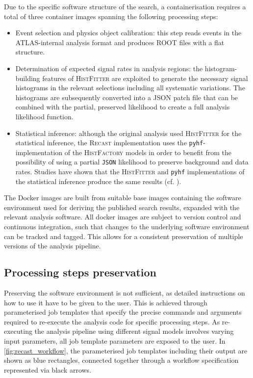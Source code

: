Due to the specific software structure of the \onelepton search, a containerisation requires a total of three container images spanning the following processing steps:
\begin{itemize}
	\item Event selection and physics object calibration: this step reads events in the ATLAS-internal analysis format and produces \textsc{ROOT} files with a flat structure.
	\item Determination of expected signal rates in analysis regions: the histogram-building features of \textsc{HistFitter} are exploited to generate the necessary signal histograms in the relevant selections including all systematic variations. The histograms are subsequently converted into a \textsc{JSON} patch file that can be combined with the partial, preserved likelihood to create a full analysis likelihood function.
	\item Statistical inference: although the original analysis used \textsc{HistFitter} for the statistical inference, the \textsc{Recast} implementation uses the \texttt{pyhf}-implementation of the \textsc{HistFactory} models in order to benefit from the possibility of using a partial \texttt{JSON} likelihood to preserve background and data rates. Studies have shown that the \textsc{HistFitter} and \texttt{pyhf} implementations of the statistical inference produce the same results (cf. \eg {}\cite{ATL-PHYS-PUB-2019-029}).
\end{itemize}

The Docker images are built from suitable base images containing the software environment used for deriving the published \onelepton search results, expanded with the relevant analysis software. All docker images are subject to version control and continuous integration, such that changes to the underlying software environment can be tracked and tagged. This allows for a consistent preservation of multiple versions of the analysis pipeline. 

\subsection{Processing steps preservation}

Preserving the software environment is not sufficient, as detailed instructions on how to use it have to be given to the user. This is achieved through parameterised job templates that specify the precise commands and arguments required to re-execute the analysis code for specific processing steps. As re-executing the analysis pipeline using different signal models involves varying input parameters, all job template parameters are exposed to the user. In \cref{fig:recast_workflow}, the parameterised job templates including their output are shown as blue rectangles, connected together through a workflow specification represented via black arrows. 

